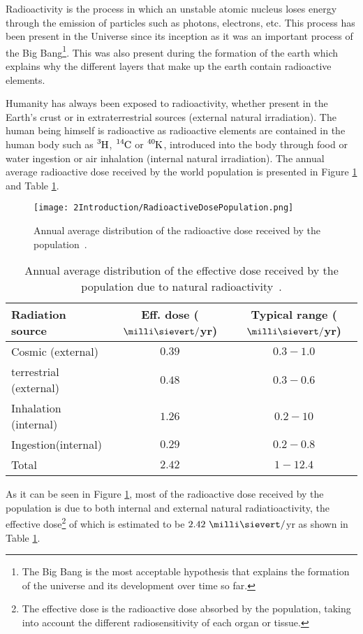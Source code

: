 Radioactivity is the process in which an unstable atomic nucleus loses energy through the emission of particles such as photons, electrons, etc. This process has been present in the Universe since its inception as it was an important process of the Big Bang\footnote{The Big Bang is the most acceptable hypothesis that explains the formation of the universe and its development over time so far.}. This was also present during the formation of the earth which explains why the different layers that make up the earth contain radioactive elements. 

Humanity has always been exposed to radioactivity, whether present in the Earth's crust or in extraterrestrial sources (external natural irradiation). The human being himself is radioactive as radioactive elements are contained in the human body such as $\ce{^{3}H}$, $\ce{^{14}C}$ or $\ce{^{40}K}$, introduced into the body through food or water ingestion or air inhalation (internal natural irradiation). The annual average radioactive dose received by the world population is presented in Figure \ref{fig:RadioactiveDosePopulation} and Table \ref{tab:RadioactiveNaturalDosePopulation}.

\begin{figure}[h]
\texttt{[image: 2Introduction/RadioactiveDosePopulation.png]}
\centering
\caption{Annual average distribution of the radioactive dose received by the population~\cite{IAEA}\label{fig:RadioactiveDosePopulation}.}
\end{figure}

\begin{table}[htbp]
\centering{}%
\begin{tabular}{lcc}
\toprule 
Radiation source & Eff. dose ($\milli\sievert/$yr) & Typical range ($\milli\sievert/$yr)\tabularnewline
\midrule
\midrule 
Cosmic (external) & $0.39$ & $0.3 - 1.0$ \tabularnewline
terrestrial (external) & $0.48$ & $0.3-0.6$ \tabularnewline  
Inhalation (internal) & $1.26$ & $0.2-10$ \tabularnewline
Ingestion(internal) & $0.29$ & $0.2-0.8$ \tabularnewline
\midrule
Total & $2.42$ & $1-12.4$ \tabularnewline
\bottomrule
\end{tabular}
\caption{Annual average distribution of the effective dose received by the population due to natural radioactivity~\cite{UNSCEAR, CSN}.}
\label{tab:RadioactiveNaturalDosePopulation}
\end{table}

As it can be seen in Figure \ref{fig:RadioactiveDosePopulation}, most of the radioactive dose received by the population is due to both internal and external natural radiatioactivity, the effective dose\footnote{The effective dose is the radioactive dose absorbed by the population, taking into account the different radiosensitivity of each organ or tissue.} of which is estimated to be $2.42~\milli\sievert/$yr as shown in Table \ref{tab:RadioactiveNaturalDosePopulation}. 

